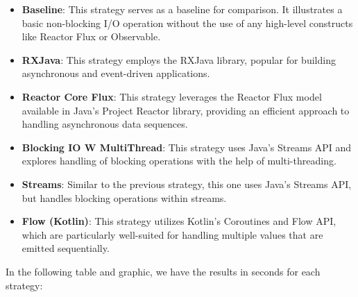     \begin{itemize}
        \item \textbf{Baseline}: This strategy serves as a baseline for comparison. It illustrates a basic non-blocking I/O operation without the use of any high-level constructs like Reactor Flux or Observable.
        \item \textbf{RXJava}: This strategy employs the RXJava library, popular for building asynchronous and event-driven applications.
        \item \textbf{Reactor Core Flux}: This strategy leverages the Reactor Flux model available in Java's Project Reactor library, providing an efficient approach to handling asynchronous data sequences.
        \item \textbf{Blocking IO W MultiThread}: This strategy uses Java's Streams API and explores handling of blocking operations with the help of multi-threading.
        \item \textbf{Streams}: Similar to the previous strategy, this one uses Java's Streams API, but handles blocking operations within streams.
        \item \textbf{Flow (Kotlin)}: This strategy utilizes Kotlin's Coroutines and Flow API, which are particularly well-suited for handling multiple values that are emitted sequentially.
    \end{itemize}

    In the following table and graphic, we have the results in seconds for each strategy:

    \begin{table}[H]
        \centering
        \caption{Processing times for different Java/Kotlin strategies for "Group Words".}
        \label{tab:strategies_times_group_words}
    \end{table}
        
